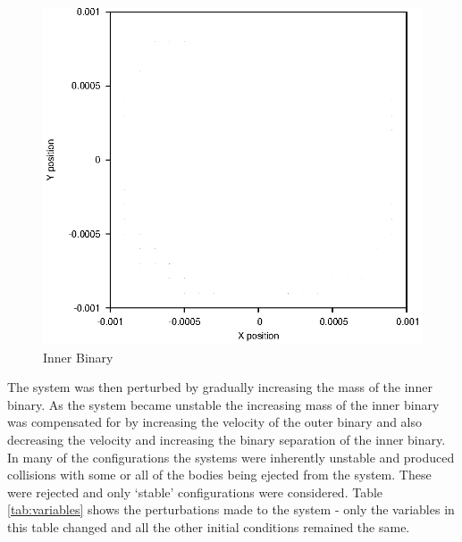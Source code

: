 \documentclass[a4paper,12pt]{article}
\begin{document}
\begin{figure}[H]
\centering
\includegraphics[width=.9\textwidth]{./2016results/innerbinary/Orbit.eps}
\caption{Inner Binary}
\label{fig:innerbinary}
\end{figure}
The system was then perturbed by gradually increasing the mass of the inner binary. As the system became unstable the increasing mass of the inner binary 
was compensated for by increasing the velocity of the outer binary and also decreasing the velocity and increasing the binary 
separation of the inner binary. In many of the configurations the systems were inherently unstable and produced collisions with some 
or all of the bodies being ejected from the system. These were rejected and only `stable' configurations were considered.
Table \ref{tab:variables} shows the perturbations made to the system - only the variables in this table changed and all the other initial
conditions remained the same.
\end{document}
